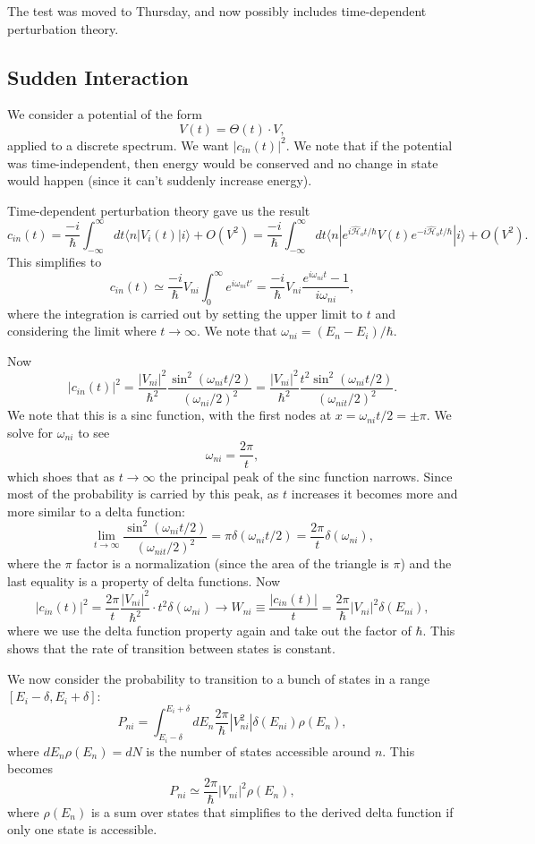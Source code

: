 \documentclass[fontsize=12pt]{scrartcl}
\newcommand{\la}{\langle}
\newcommand{\ra}{\rangle}
\newcommand{\Ham}{\hat{\mathcal{H}}}
\begin{document}
The test was moved to Thursday, and now possibly includes time-dependent perturbation theory.

\subsection{Sudden Interaction}

We consider a potential of the form $$V(t)=\Theta(t)\cdot V,$$ applied to a discrete spectrum. We want $|c_{in}(t)|^2$. We note that if the potential was time-independent, then energy would be conserved and no change in state would happen (since it can't suddenly increase energy).

Time-dependent perturbation theory gave us the result $$c_{in}(t)=\frac{-i}{\hbar}\int_{-\infty}^{\infty}dt \la n|V_i(t)|i\ra + O(V^2) = \frac{-i}{\hbar}\int_{-\infty}^{\infty} dt \la n | e^{i\Ham_ot/\hbar}V(t)e^{-i\Ham_ot/\hbar}|i\ra+O(V^2).$$ This simplifies to $$c_{in}(t)\simeq \frac{-i}{\hbar}V_{ni}\int_0^\infty e^{i\omega_{ni}t'} = \frac{-i}{\hbar}V_{ni}\frac{e^{i\omega_{ni}t}-1}{i\omega_{ni}},$$ where the integration is carried out by setting the upper limit to $t$ and considering the limit where $t\to\infty$. We note that $\omega_{ni}=(E_n-E_i)/\hbar.$

Now $$|c_{in}(t)|^2 = \frac{|V_{ni}|^2}{\hbar^2}\frac{\sin^2(\omega_{ni}t/2)}{(\omega_{ni}/2)^2} = \frac{|V_{ni}|^2}{\hbar^2}\frac{t^2\sin^2(\omega_{ni}t/2)}{(\omega_{nit}/2)^2}.$$ We note that this is a sinc function, with the first nodes at $x=\omega_{ni}t/2 = \pm \pi$. We solve for $\omega_{ni}$ to see $$\omega_{ni}=\frac{2\pi}{t},$$ which shoes that as $t\to\infty$ the principal peak of the sinc function narrows. Since most of the probability is carried by this peak, as $t$ increases it becomes more and more similar to a delta function: $$\lim\limits_{t\to\infty}\frac{\sin^2(\omega_{ni}t/2)}{(\omega_{nit}/2)^2} = \pi \delta(\omega_{ni}t/2) = \frac{2\pi}{t}\delta(\omega_{ni}),$$ where the $\pi$ factor is a normalization (since the area of the triangle is $\pi$) and the last equality is a property of delta functions. Now $$|c_{in}(t)|^2 = \frac{2\pi}{t}\frac{|V_{ni}|^2}{\hbar^2}\cdot t^2\delta(\omega_{ni}) \to W_{ni}\equiv \frac{|c_{in}(t)|}{t} = \frac{2\pi}{\hbar}|V_{ni}|^2\delta(E_{ni}),$$ where we use the delta function property again and take out the factor of $\hbar$. This shows that the rate of transition between states is constant.

We now consider the probability to transition to a bunch of states in a range $[E_i-\delta, E_i+\delta]$: $$P_{ni}=\int_{E_i-\delta}^{E_i+\delta} dE_n \frac{2\pi}{\hbar}|V_{ni}^2| \delta(E_{ni})\rho(E_n),$$ where $dE_n\rho(E_n)=dN$ is the number of states accessible around $n$. This becomes $$P_{ni}\simeq\frac{2\pi}{\hbar}|V_{ni}|^2\rho(E_n),$$ where $\rho(E_n)$ is a sum over states that simplifies to the derived delta function if only one state is accessible.
\end{document}
